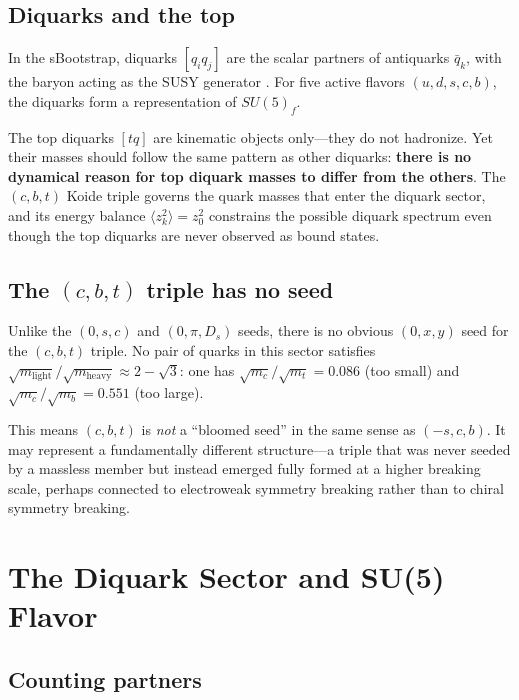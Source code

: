 \documentclass[12pt,a4paper]{article}
\begin{document}
\subsection{Diquarks and the top}

In the sBootstrap, diquarks $[q_i q_j]$ are the scalar partners of 
antiquarks $\bar{q}_k$, with the baryon acting as the SUSY generator 
\cite{CattoGursey, Miyazawa}. For five active flavors 
$(u, d, s, c, b)$, the diquarks form a representation of $SU(5)_f$.

The top diquarks $[tq]$ are kinematic objects only---they do not 
hadronize. Yet their masses should follow the same pattern as other 
diquarks: \textbf{there is no dynamical reason for top diquark masses 
to differ from the others}. The $(c,b,t)$ Koide triple governs the 
quark masses that enter the diquark sector, and its energy balance 
$\langle z_k^2\rangle = z_0^2$ constrains the possible diquark 
spectrum even though the top diquarks are never observed as bound 
states.

\subsection{The $(c,b,t)$ triple has no seed}

Unlike the $(0,s,c)$ and $(0,\pi,D_s)$ seeds, there is no obvious 
$(0, x, y)$ seed for the $(c,b,t)$ triple. No pair of quarks in this 
sector satisfies $\sqrt{m_{\text{light}}}/\sqrt{m_{\text{heavy}}} 
\approx 2 - \sqrt{3}$: one has $\sqrt{m_c}/\sqrt{m_t} = 0.086$ 
(too small) and $\sqrt{m_c}/\sqrt{m_b} = 0.551$ (too large).

This means $(c,b,t)$ is \emph{not} a ``bloomed seed'' in the same 
sense as $(-s,c,b)$. It may represent a fundamentally different 
structure---a triple that was never seeded by a massless member but 
instead emerged fully formed at a higher breaking scale, perhaps 
connected to electroweak symmetry breaking rather than to chiral 
symmetry breaking.

\section{The Diquark Sector and SU(5) Flavor}
\label{sec:diquarks}

\subsection{Counting partners}
\end{document}
